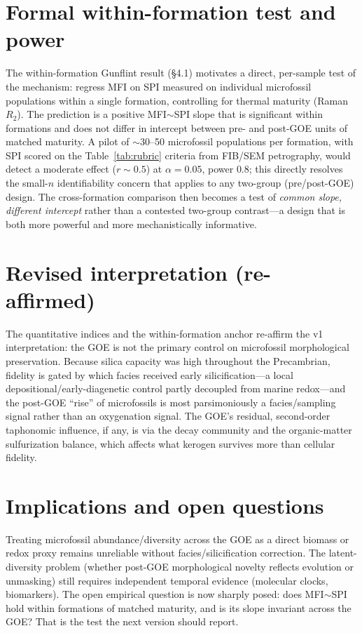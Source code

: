 \documentclass[11pt]{article}
\begin{document}
\section{Formal within-formation test and power}

The within-formation Gunflint result (\S4.1) motivates a direct, per-sample test of the mechanism:
regress MFI on SPI measured on individual microfossil populations within a single formation,
controlling for thermal maturity (Raman $R_2$). The prediction is a positive MFI$\sim$SPI slope that
is significant within formations and does not differ in intercept between pre- and post-GOE units of
matched maturity. A pilot of $\sim$30--50 microfossil populations per formation, with SPI scored on
the Table~\ref{tab:rubric} criteria from FIB/SEM petrography, would detect a moderate effect
($r\sim0.5$) at $\alpha=0.05$, power $0.8$; this directly resolves the small-$n$ identifiability
concern that applies to any two-group (pre/post-GOE) design. The cross-formation comparison then
becomes a test of \emph{common slope, different intercept} rather than a contested two-group
contrast---a design that is both more powerful and more mechanistically informative.

\section{Revised interpretation (re-affirmed)}

The quantitative indices and the within-formation anchor re-affirm the v1 interpretation: the GOE is
not the primary control on microfossil morphological preservation. Because silica capacity was high
throughout the Precambrian, fidelity is gated by which facies received early silicification---a local
depositional/early-diagenetic control partly decoupled from marine redox---and the post-GOE ``rise''
of microfossils is most parsimoniously a facies/sampling signal rather than an oxygenation signal.
The GOE's residual, second-order taphonomic influence, if any, is via the decay community and the
organic-matter sulfurization balance, which affects what kerogen survives more than cellular
fidelity.

\section{Implications and open questions}
Treating microfossil abundance/diversity across the GOE as a direct biomass or redox proxy remains
unreliable without facies/silicification correction. The latent-diversity problem (whether post-GOE
morphological novelty reflects evolution or unmasking) still requires independent temporal evidence
(molecular clocks, biomarkers). The open empirical question is now sharply posed: does
MFI$\sim$SPI hold within formations of matched maturity, and is its slope invariant across the GOE?
That is the test the next version should report.
\end{document}
